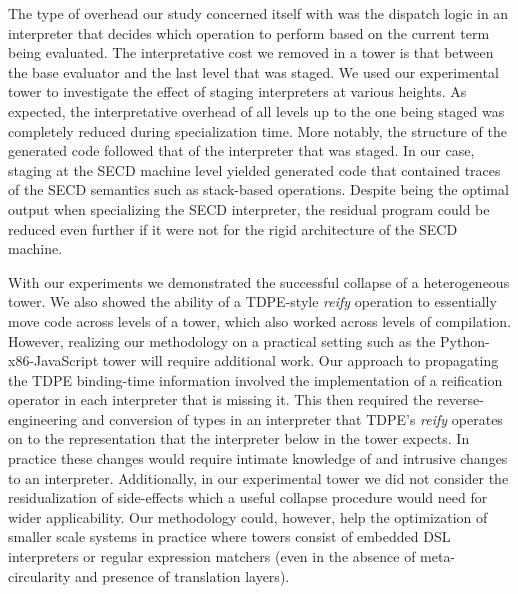 \documentclass[a4paper,12pt,twoside,openright]{report}
\theoremstyle{definition}
\begin{document}
The type of overhead our study concerned itself with was the dispatch logic in an interpreter that decides which operation to perform based on the current term being evaluated. The interpretative cost we removed in a tower is that between the base evaluator and the last level that was staged. We used our experimental tower to investigate the effect of staging interpreters at various heights. As expected, the interpretative overhead of all levels up to the one being staged was completely reduced during specialization time. More notably, the structure of the generated code followed that of the interpreter that was staged. In our case, staging at the SECD machine level yielded generated code that contained traces of the SECD semantics such as stack-based operations. Despite being the optimal output when specializing the SECD interpreter, the residual program could be reduced even further if it were not for the rigid architecture of the SECD machine.


With our experiments we demonstrated the successful collapse of a heterogeneous tower. We also showed the ability of a TDPE-style \textit{reify} operation to essentially move code across levels of a tower, which also worked across levels of compilation. However, realizing our methodology on a practical setting such as the Python-x86-JavaScript tower will require additional work. Our approach to propagating the TDPE binding-time information involved the implementation of a reification operator in each interpreter that is missing it. This then required the reverse-engineering and conversion of types in an interpreter that TDPE's \textit{reify} operates on to the representation that the interpreter below in the tower expects. In practice these changes would require intimate knowledge of and intrusive changes to an interpreter. Additionally, in our experimental tower we did not consider the residualization of side-effects which a useful collapse procedure would need for wider applicability. Our methodology could, however, help the optimization of smaller scale systems in practice where towers consist of embedded DSL interpreters or regular expression matchers (even in the absence of meta-circularity and presence of translation layers).

\end{document}
